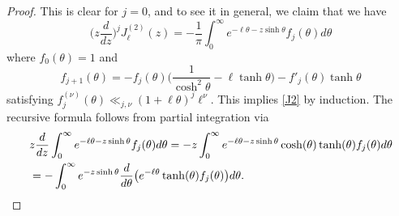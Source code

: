 \documentclass[10pt,a4paper]{amsart}
\begin{document}
\begin{proof}
This is clear for $j=0$, and to see it in general, we claim that  we have
\[  \Big(z \frac{d}{dz}\Big)^j J_{\ell}^{(2)}(z) = -\frac{1}{\pi} \int_0^{\infty} e^{-\ell \theta - z\sinh\theta} f_j(  \theta) d\theta \]
where $f_0(\theta) = 1$ and 
\[ f_{j+1}( \theta) = -f_j(\theta)\Big( \frac{1}{\cosh^2\theta} - \ell \tanh\theta\Big) - f'_j(\theta)\tanh\theta \]
satisfying $f^{(\nu)}_j(\theta) \ll_{j, \nu} (1 + \ell \theta)^j \ell^{\nu}.$
This implies \eqref{J2} by induction. The recursive formula follows from partial integration via
\begin{align}
&z \frac{d}{dz} \int_0^{\infty} e^{-\ell \theta - z\sinh\theta} f_j(  \theta) d\theta = -z\int_0^{\infty} e^{-\ell \theta - z\sinh\theta}\cosh(\theta) \tanh(\theta) f_j(  \theta) d\theta \\
& = %
- \int_0^{\infty} e^{  - z\sinh\theta}\frac{d}{d\theta} \big(e^{-\ell \theta} \tanh(\theta) f_j(  \theta)\big) d\theta . \qedhere
\end{align}
\end{proof}
\end{document}
